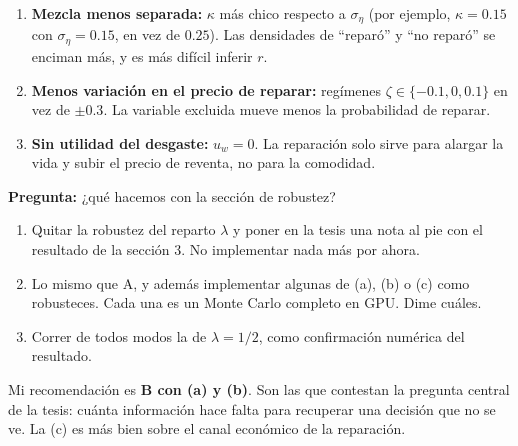 \documentclass[11pt]{article}
\begin{document}
\begin{enumerate}
  \item[(a)] \textbf{Mezcla menos separada:} $\kappa$ más chico respecto a $\sigma_\eta$ (por
  ejemplo, $\kappa=0.15$ con $\sigma_\eta=0.15$, en vez de $0.25$). Las densidades de
  ``reparó'' y ``no reparó'' se enciman más, y es más difícil inferir $r$.
  \item[(b)] \textbf{Menos variación en el precio de reparar:} regímenes
  $\zeta\in\{-0.1,0,0.1\}$ en vez de $\pm0.3$. La variable excluida mueve menos la
  probabilidad de reparar.
  \item[(c)] \textbf{Sin utilidad del desgaste:} $u_w=0$. La reparación solo sirve para alargar
  la vida y subir el precio de reventa, no para la comodidad.
\end{enumerate}

\noindent\textbf{Pregunta:} ¿qué hacemos con la sección de robustez?
\begin{enumerate}
  \item[\textbf{A.}] Quitar la robustez del reparto $\lambda$ y poner en la tesis una nota al pie
  con el resultado de la sección 3. No implementar nada más por ahora.
  \item[\textbf{B.}] Lo mismo que A, y además implementar algunas de (a), (b) o (c) como
  robusteces. Cada una es un Monte Carlo completo en GPU. Dime cuáles.
  \item[\textbf{C.}] Correr de todos modos la de $\lambda=1/2$, como confirmación numérica del
  resultado.
\end{enumerate}

\noindent Mi recomendación es \textbf{B con (a) y (b)}. Son las que contestan la pregunta
central de la tesis: cuánta información hace falta para recuperar una decisión que no se ve.
La (c) es más bien sobre el canal económico de la reparación.
\end{document}
